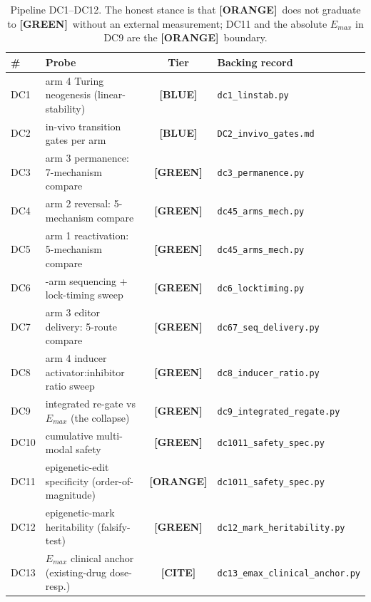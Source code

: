\documentclass[11pt,a4paper]{article}
\newcommand{\tierbadge}[2]{\textcolor{#1}{\textbf{[#2]}}}
\providecommand{\tierBlue}{\tierbadge{blue!60!black}{BLUE}}
\providecommand{\tierGreen}{\tierbadge{green!45!black}{GREEN}}
\providecommand{\tierYellow}{\tierbadge{yellow!50!black}{CITE}}
\providecommand{\tierOrange}{\tierbadge{orange!80!black}{ORANGE}}
\begin{document}
\medskip
\begin{table}[h]
\centering
\small
\begin{tabular}{@{}>{\centering\arraybackslash}m{0.5cm} >{\raggedright\arraybackslash}m{6.4cm} c >{\raggedright\arraybackslash}m{4.4cm}@{}}
\toprule
\textbf{\#} & \textbf{Probe} & \textbf{Tier} & \textbf{Backing record} \\
\midrule
DC1  & arm 4 Turing neogenesis (linear-stability)        & \tierBlue  & \texttt{dc1\_linstab.py} \\
DC2  & in-vivo transition gates per arm                  & \tierBlue  & \texttt{DC2\_invivo\_gates.md} \\
DC3  & arm 3 permanence: 7-mechanism compare             & \tierGreen & \texttt{dc3\_permanence.py} \\
DC4  & arm 2 reversal: 5-mechanism compare               & \tierGreen & \texttt{dc45\_arms\_mech.py} \\
DC5  & arm 1 reactivation: 5-mechanism compare           & \tierGreen & \texttt{dc45\_arms\_mech.py} \\
DC6  & 4-arm sequencing + lock-timing sweep              & \tierGreen & \texttt{dc6\_locktiming.py} \\
DC7  & arm 3 editor delivery: 5-route compare            & \tierGreen & \texttt{dc67\_seq\_delivery.py} \\
DC8  & arm 4 inducer activator:inhibitor ratio sweep     & \tierGreen & \texttt{dc8\_inducer\_ratio.py} \\
DC9  & integrated re-gate vs $E_{max}$ (the collapse)    & \tierGreen & \texttt{dc9\_integrated\_regate.py} \\
DC10 & cumulative multi-modal safety                     & \tierGreen & \texttt{dc1011\_safety\_spec.py} \\
DC11 & epigenetic-edit specificity (order-of-magnitude)  & \tierOrange& \texttt{dc1011\_safety\_spec.py} \\
DC12 & epigenetic-mark heritability (falsify-test)       & \tierGreen & \texttt{dc12\_mark\_heritability.py} \\
DC13 & $E_{max}$ clinical anchor (existing-drug dose-resp.)& \tierYellow& \texttt{dc13\_emax\_clinical\_anchor.py} \\
\bottomrule
\end{tabular}
\caption{Pipeline DC1--DC12. The honest stance is that \tierOrange\ does not
graduate to \tierGreen\ without an external measurement; DC11 and the absolute
$E_{max}$ in DC9 are the \tierOrange\ boundary.}
\label{tab:pipeline}
\end{table}
\end{document}
